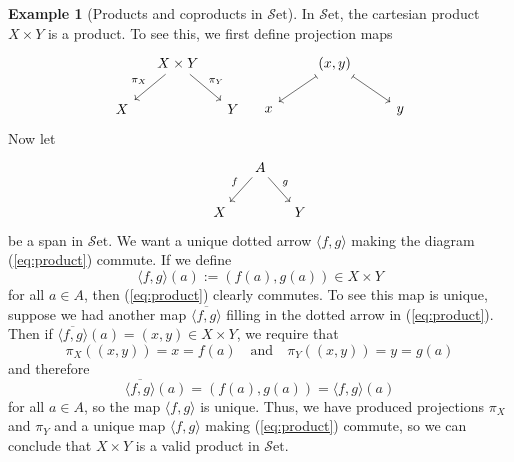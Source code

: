 \documentclass[10pt,oneside]{book}
\def\~#1{\mathscr{#1}}
\newcommand{\Set}{\~S\mathrm{et}}
\theoremstyle{plain}
\theoremstyle{definition}
\newtheorem{ex}[thm]{Example}
\theoremstyle{remark}
\numberwithin{equation}{section}
\numberwithin{figure}{section}
\begin{document}
\begin{ex}[Products and coproducts in $\Set$]
    In $\Set$, the cartesian product $X \times Y$ is a product. To see this, we first define projection maps 
    \[\begin{tikzcd}[column sep=small]
    & {X \times Y} \\
    X && Y
    \arrow["{\pi_X}"', from=1-2, to=2-1]
    \arrow["{\pi_Y}", from=1-2, to=2-3]
    \end{tikzcd} \quad \begin{tikzcd}
    & {(x, y)} \\
    x && y
    \arrow[maps to, from=1-2, to=2-1]
    \arrow[maps to, from=1-2, to=2-3]
\end{tikzcd}\]
Now let 
    \[\begin{tikzcd}[column sep=small]
    & A \\
    X && Y
    \arrow["f"', from=1-2, to=2-1]
    \arrow["g", from=1-2, to=2-3]
    \end{tikzcd}\]
be a span in $\Set$. We want a unique dotted arrow $\langle f,g \rangle$ making the diagram (\ref{eq:product}) commute. If we define
    \[\langle f, g \rangle (a) := (f(a), g(a)) \in X \times Y\]
for all $a \in A$, then (\ref{eq:product}) clearly commutes. To see this map is unique, suppose we had another map $\overline{\langle f, g \rangle}$ filling in the dotted arrow in (\ref{eq:product}). Then if $\overline{\langle f, g \rangle}(a) = (x, y) \in X \times Y$, we require that
    \[\pi_X \left((x, y) \right) = x = f(a) \quad \text{and} \quad \pi_Y \left((x, y) \right) = y = g(a)\]
and therefore
\[\overline{\langle f, g \rangle}(a) = \left(f(a), g(a)\right) = \langle f, g \rangle(a)\]
for all $a \in A$, so the map $\langle f, g \rangle$ is unique. Thus, we have produced projections $\pi_X$ and $\pi_Y$ and a unique map $\langle f, g \rangle$ making (\ref{eq:product}) commute, so we can conclude that $X \times Y$ is a valid product in $\Set$.


\end{ex}
\end{document}
